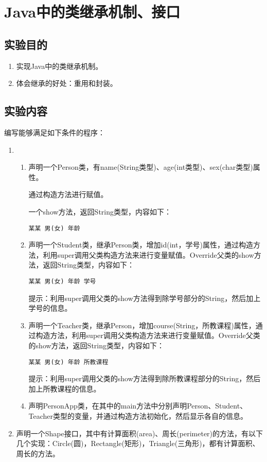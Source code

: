﻿\documentclass[cs5size,b5paper,nofonts,twoside]{ctexart}
\begin{document}
\clearpage
\section{Java中的类继承机制、接口}
\subsection{实验目的}
\begin{enumerate}
\item 实现Java中的类继承机制。
\item 体会继承的好处：重用和封装。
\end{enumerate}
\subsection{实验内容}
编写能够满足如下条件的程序：
\begin{enumerate}
\item
\begin{enumerate}
\item 声明一个Person类，有name(String类型)、age(int类型)、sex(char类型)属性。

      通过构造方法进行赋值。
	  
      一个show方法，返回String类型，内容如下：
         \begin{verbatim}某某 男(女) 年龄\end{verbatim}
\item 声明一个Student类，继承Person类，增加id(int，学号)属性，通过构造方法，利用super调用父类构造方法来进行变量赋值。Override父类的show方法，返回String类型，内容如下：
         \begin{verbatim}某某 男(女) 年龄 学号\end{verbatim}
提示：利用super调用父类的show方法得到除学号部分的String，然后加上学号的信息。
\item 声明一个Teacher类，继承Person，增加course(String，所教课程)属性，通过构造方法，利用super调用父类构造方法来进行变量赋值。Override父类的show方法，返回String类型，内容如下：
      \begin{verbatim}某某 男(女) 年龄 所教课程\end{verbatim}
提示：利用super调用父类的show方法得到除所教课程部分的String，然后加上所教课程的信息。
\item 声明PersonApp类，在其中的main方法中分别声明Person、Student、Teacher类型的变量，并通过构造方法初始化，然后显示各自的信息。
\end{enumerate}
\item 声明一个Shape接口，其中有计算面积(area)、周长(perimeter)的方法，有以下几个实现：Circle(圆)，Rectangle(矩形)，Triangle(三角形)，都有计算面积、周长的方法。
\end{enumerate}
\end{document}
